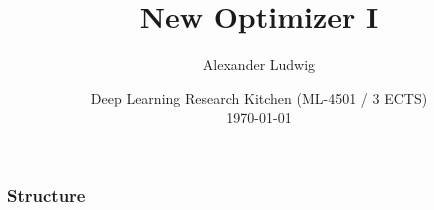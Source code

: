 \documentclass[
	11pt, %
	aspectratio=169, %
]{beamer}
\title[New Optimizer I]{New Optimizer I} %
\subtitle{} %
\author[]{Alexander Ludwig} %
\date[\today]{Deep Learning Research Kitchen (ML-4501 / 3 ECTS) \\ \today} %
\begin{document}

\begin{frame}
	\titlepage %
\end{frame}



\begin{frame}
	\frametitle{Structure} %
	
	\tableofcontents %
\end{frame}


\section{} %
\end{document}
